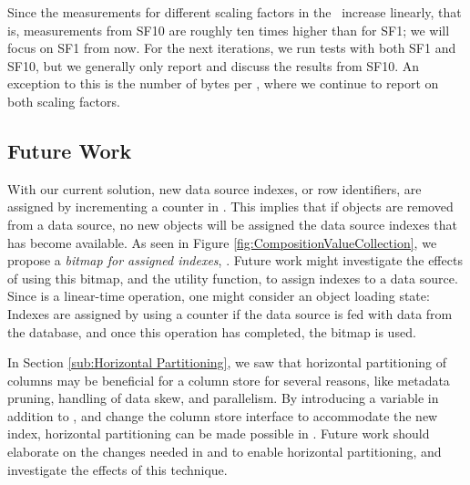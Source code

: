 Since the measurements for different scaling factors in the \tpchdl~increase linearly, that is, measurements from SF10 are roughly ten times higher than for SF1; we will focus on SF1 from now. For the next iterations, we run tests with both SF1 and SF10, but we generally only report and discuss the results from SF10. An exception to this is the number of bytes per \lineitem, where we continue to report on both scaling factors.

\subsection{Future Work}
\label{sub:column-store:future-work}
With our current solution, new data source indexes, or row identifiers, are assigned by incrementing a counter in . This implies that if objects are removed from a data source, no new objects will be assigned the data source indexes that has become available. As seen in Figure \ref{fig:CompositionValueCollection}, we propose a \textit{bitmap for assigned indexes}, . Future work might investigate the effects of using this bitmap, and the  utility function, to assign indexes to a data source. Since  is a linear-time operation, one might consider an object loading state: Indexes are assigned by using a counter if the data source is fed with data from the database, and once this operation has completed, the  bitmap is used.

In Section \ref{sub:Horizontal Partitioning}, we saw that horizontal partitioning of columns may be beneficial for a column store for several reasons, like metadata pruning, handling of data skew, and parallelism. By introducing a  variable in addition to , and change the column store interface to accommodate the new index, horizontal partitioning can be made possible in \gap. Future work should elaborate on the changes needed in  and  to enable horizontal partitioning, and investigate the effects of this technique.


